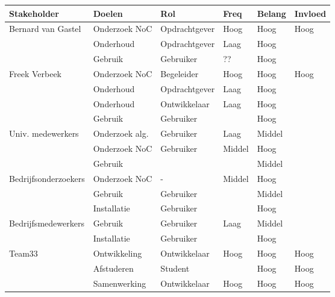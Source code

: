 \documentclass[a4paper,11pt,twoside,draft]{article}
\begin{document}
{\tiny
\begin{center}
\begin{tabular}{llllll}\hline
{\bf Stakeholder}    & {\bf Doelen}   & {\bf Rol}     & {\bf Freq} & {\bf Belang} & {\bf Invloed}\\\hline
Bernard van Gastel   & Onderzoek NoC  & Opdrachtgever & Hoog       & Hoog   & Hoog \\
                     & Onderhoud      & Opdrachtgever & Laag       & Hoog   &  \\
                     & Gebruik        & Gebruiker     & ??         & Hoog   & \\
Freek Verbeek        & Onderzoek NoC  & Begeleider    & Hoog       & Hoog   & Hoog\\
                     & Onderhoud      & Opdrachtgever & Laag       & Hoog   & \\
                     & Onderhoud      & Ontwikkelaar  & Laag       & Hoog   & \\
                     & Gebruik        & Gebruiker     &            & Hoog   & \\
Univ. medewerkers    & Onderzoek alg. & Gebruiker     & Laag       & Middel & \\
                     & Onderzoek NoC  & Gebruiker     & Middel     & Hoog   & \\
                     & Gebruik        &               &            & Middel & \\
Bedrijfsonderzoekers & Onderzoek NoC  & -             & Middel     & Hoog   & \\
                     & Gebruik        & Gebruiker     &            & Middel & \\
                     & Installatie    & Gebruiker     &            & Hoog   & \\
Bedrijfsmedewerkers  & Gebruik        & Gebruiker     & Laag       & Middel & \\
                     & Installatie    & Gebruiker     &            & Hoog   & \\
Team33               & Ontwikkeling   & Ontwikkelaar  & Hoog       & Hoog   & Hoog\\
                     & Afstuderen     & Student       &            & Hoog   & Hoog\\
                     & Samenwerking   & Ontwikkelaar  & Hoog       & Hoog   & Hoog\\
\hline
\end{tabular}
\end{center}
}%
\end{document}
